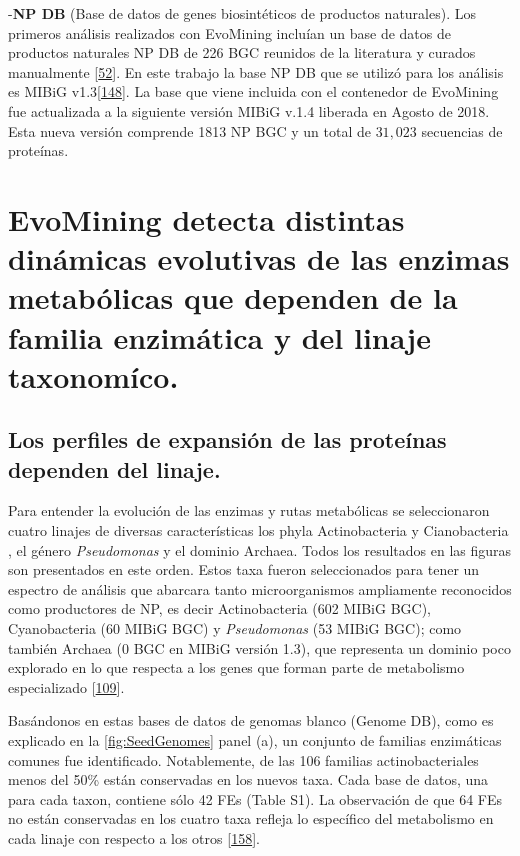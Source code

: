 \documentclass[12pt,twoside]{reedthesis}
\begin{document}
  -\textbf{NP DB} (Base de datos de genes biosintéticos de productos
  naturales). Los primeros análisis realizados con EvoMining incluían un
  base de datos de productos naturales NP DB de 226 BGC reunidos de la
  literatura y curados manualmente
  {[}\protect\hyperlink{ref-cruz-morales_phylogenomic_2016}{52}{]}. En
  este trabajo la base NP DB que se utilizó para los análisis es MIBiG
  v1.3{[}\protect\hyperlink{ref-medema_minimum_2015}{148}{]}. La base que
  viene incluida con el contenedor de EvoMining fue actualizada a la
  siguiente versión MIBiG v.1.4 liberada en Agosto de 2018. Esta nueva
  versión comprende 1813 NP BGC y un total de \(31,023\) secuencias de
  proteínas.
  
  \section{EvoMining detecta distintas dinámicas evolutivas de las enzimas
  metabólicas que dependen de la familia enzimática y del linaje
  taxonomíco.}\label{evomining-detecta-distintas-dinamicas-evolutivas-de-las-enzimas-metabolicas-que-dependen-de-la-familia-enzimatica-y-del-linaje-taxonomico.}
  
  \subsection{Los perfiles de expansión de las proteínas dependen del
  linaje.}\label{los-perfiles-de-expansion-de-las-proteinas-dependen-del-linaje.}
  
  Para entender la evolución de las enzimas y rutas metabólicas se
  seleccionaron cuatro linajes de diversas características los phyla
  Actinobacteria y Cianobacteria , el género \emph{Pseudomonas} y el
  dominio Archaea. Todos los resultados en las figuras son presentados en
  este orden. Estos taxa fueron seleccionados para tener un espectro de
  análisis que abarcara tanto microorganismos ampliamente reconocidos como
  productores de NP, es decir Actinobacteria (602 MIBiG BGC),
  Cyanobacteria (60 MIBiG BGC) y \emph{Pseudomonas} (53 MIBiG BGC); como
  también Archaea (0 BGC en MIBiG versión 1.3), que representa un dominio
  poco explorado en lo que respecta a los genes que forman parte de
  metabolismo especializado
  {[}\protect\hyperlink{ref-charlesworth_untapped_2015}{109}{]}.
  
  Basándonos en estas bases de datos de genomas blanco (Genome DB), como
  es explicado en la \autoref{fig:SeedGenomes} panel (a), un conjunto de
  familias enzimáticas comunes fue identificado. Notablemente, de las 106
  familias actinobacteriales menos del 50\% están conservadas en los
  nuevos taxa. Cada base de datos, una para cada taxon, contiene sólo 42
  FEs (Table S1). La observación de que 64 FEs no están conservadas en los
  cuatro taxa refleja lo específico del metabolismo en cada linaje con
  respecto a los otros
  {[}\protect\hyperlink{ref-jordan_lineage-specific_2001}{158}{]}.
  
\end{document}
